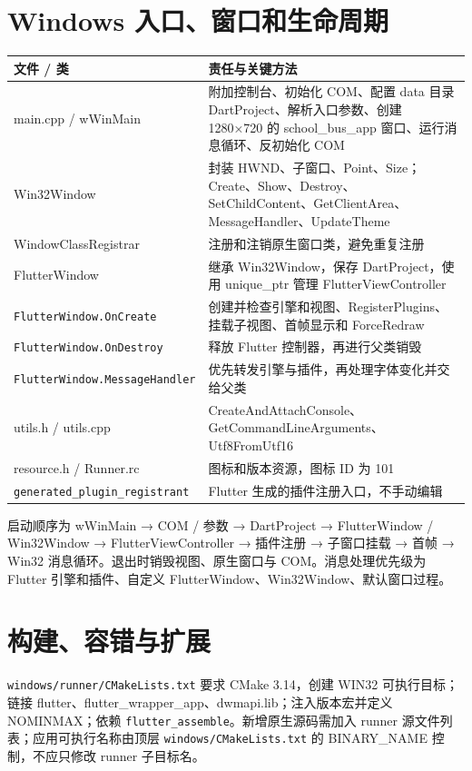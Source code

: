 \documentclass[UTF8,fontset=fandol,zihao=-4,oneside]{ctexrep}
\newcommand{\pathcode}[1]{\nolinkurl{#1}}
\begin{document}
\section{Windows 入口、窗口和生命周期}
\begin{longtable}{p{4.2cm}p{10.5cm}}
\toprule 文件 / 类 & 责任与关键方法 \\ \midrule
main.cpp / wWinMain & 附加控制台、初始化 COM、配置 data 目录 DartProject、解析入口参数、创建 1280×720 的 school\_bus\_app 窗口、运行消息循环、反初始化 COM \\
Win32Window & 封装 HWND、子窗口、Point、Size；Create、Show、Destroy、SetChildContent、GetClientArea、MessageHandler、UpdateTheme \\
WindowClassRegistrar & 注册和注销原生窗口类，避免重复注册 \\
FlutterWindow & 继承 Win32Window，保存 DartProject，使用 unique\_ptr 管理 FlutterViewController \\
\pathcode{FlutterWindow.OnCreate} & 创建并检查引擎和视图、RegisterPlugins、挂载子视图、首帧显示和 ForceRedraw \\
\pathcode{FlutterWindow.OnDestroy} & 释放 Flutter 控制器，再进行父类销毁 \\
\pathcode{FlutterWindow.MessageHandler} & 优先转发引擎与插件，再处理字体变化并交给父类 \\
utils.h / utils.cpp & CreateAndAttachConsole、GetCommandLineArguments、Utf8FromUtf16 \\
resource.h / Runner.rc & 图标和版本资源，图标 ID 为 101 \\
\pathcode{generated_plugin_registrant} & Flutter 生成的插件注册入口，不手动编辑 \\
\bottomrule
\end{longtable}
启动顺序为 wWinMain → COM / 参数 → DartProject → FlutterWindow / Win32Window → FlutterViewController → 插件注册 → 子窗口挂载 → 首帧 → Win32 消息循环。退出时销毁视图、原生窗口与 COM。消息处理优先级为 Flutter 引擎和插件、自定义 FlutterWindow、Win32Window、默认窗口过程。

\section{构建、容错与扩展}
\pathcode{windows/runner/CMakeLists.txt} 要求 CMake 3.14，创建 WIN32 可执行目标；链接 flutter、flutter\_wrapper\_app、dwmapi.lib；注入版本宏并定义 NOMINMAX；依赖 \texttt{flutter\_assemble}。新增原生源码需加入 runner 源文件列表；应用可执行名称由顶层 \pathcode{windows/CMakeLists.txt} 的 BINARY\_NAME 控制，不应只修改 runner 子目标名。
\end{document}
